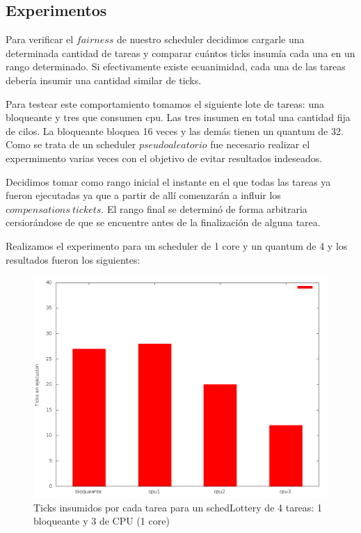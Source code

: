 \subsection{Experimentos}

Para verificar el $fairness$ de nuestro scheduler decidimos cargarle una determinada cantidad de tareas y comparar cuántos ticks insumía cada una en un rango determinado. Si efectivamente existe ecuanimidad, cada una de las tareas debería insumir una cantidad similar de ticks.

Para testear este comportamiento tomamos el siguiente lote de tareas: una bloqueante y tres que consumen cpu. Las tres insumen en total una cantidad fija de cilos. La bloqueante bloquea 16 veces y las demás tienen un quantum de 32. Como se trata de un scheduler $pseudoaleatorio$ fue necesario realizar el expermimento varias veces con el objetivo de evitar resultados indeseados.

Decidimos tomar como rango inicial el instante en el que todas las tareas ya fueron ejecutadas ya que a partir de allí comenzarán a influir los $compensations \ tickets$. El rango final se determinó de forma arbitraria cersiorándose de que se encuentre antes de la finalización de alguna tarea.

Realizamos el experimento para un scheduler de 1 core y un quantum de 4 y los resultados fueron los siguientes:

\begin{figure}[!h]
	\begin{center}
		  \includegraphics[scale=0.3]{Graficos/comp1.png}
		  \caption{Ticks insumidos por cada tarea para un schedLottery de 4 tareas: 1 bloqueante y 3 de CPU (1 core)}
		  \label{fig:contra1}
	\end{center}
\end{figure}
\FloatBarrier


